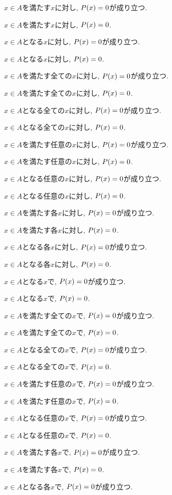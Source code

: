 \item $x\in A$を満たす$x$に対し, $P(x)=0$が成り立つ.
\item $x\in A$を満たす$x$に対し, $P(x)=0$.
\item $x\in A$となる$x$に対し, $P(x)=0$が成り立つ.
\item $x\in A$となる$x$に対し, $P(x)=0$.
\item $x\in A$を満たす全ての$x$に対し, $P(x)=0$が成り立つ.
\item $x\in A$を満たす全ての$x$に対し, $P(x)=0$.
\item $x\in A$となる全ての$x$に対し, $P(x)=0$が成り立つ.
\item $x\in A$となる全ての$x$に対し, $P(x)=0$.
\item $x\in A$を満たす任意の$x$に対し, $P(x)=0$が成り立つ.
\item $x\in A$を満たす任意の$x$に対し, $P(x)=0$.
\item $x\in A$となる任意の$x$に対し, $P(x)=0$が成り立つ.
\item $x\in A$となる任意の$x$に対し, $P(x)=0$.
\item $x\in A$を満たす各$x$に対し, $P(x)=0$が成り立つ.
\item $x\in A$を満たす各$x$に対し, $P(x)=0$.
\item $x\in A$となる各$x$に対し, $P(x)=0$が成り立つ.
\item $x\in A$となる各$x$に対し, $P(x)=0$.
\item $x\in A$となる$x$で, $P(x)=0$が成り立つ.
\item $x\in A$となる$x$で, $P(x)=0$.
\item $x\in A$を満たす全ての$x$で, $P(x)=0$が成り立つ.
\item $x\in A$を満たす全ての$x$で, $P(x)=0$.
\item $x\in A$となる全ての$x$で, $P(x)=0$が成り立つ.
\item $x\in A$となる全ての$x$で, $P(x)=0$.
\item $x\in A$を満たす任意の$x$で, $P(x)=0$が成り立つ.
\item $x\in A$を満たす任意の$x$で, $P(x)=0$.
\item $x\in A$となる任意の$x$で, $P(x)=0$が成り立つ.
\item $x\in A$となる任意の$x$で, $P(x)=0$.
\item $x\in A$を満たす各$x$で, $P(x)=0$が成り立つ.
\item $x\in A$を満たす各$x$で, $P(x)=0$.
\item $x\in A$となる各$x$で, $P(x)=0$が成り立つ.
